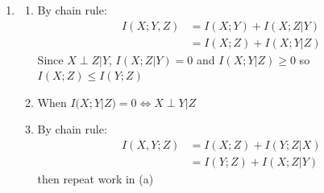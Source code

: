 \documentclass[12pt, a4paper]{article}
\begin{document}
\begin{enumerate}[Q\arabic*.]
\begin{enumerate}
      \item We have:
        \begin{align*}
          I(X_1,X_2,\dots,X_n; Y) &= H(X_1,X_2,\dots,X_n) - H(X_1,X_2,\dots,X_n|Y)\\ 
                                  &= \sum_i H(X_i | X_{i-1},\dots,X_1) - \sum_i H(X_i | X_{i-1},\dots,X_1,Y)\\ 
                                  &= \sum_i I(X_i;  Y|X_{i-1},\dots,X_1)
        \end{align*}
    \end{enumerate}

  \pagebreak
  \item 
    \begin{enumerate}
      \item By chain rule:
        \begin{align*}
          I(X;Y,Z) &= I(X;Y) + I(X;Z|Y)\\ 
                   &= I(X;Z) + I(X;Y|Z)
        \end{align*}
        Since $X\perp Z | Y$, $I(X;Z|Y) = 0$ and $I(X;Y|Z) \geq 0$ so $I(X;Z) \leq I(Y;Z)$

      \item When $I(X;Y|Z) =0 \iff X\perp Y|Z$

      \item By chain rule:
        \begin{align*}
          I(X,Y;Z) &= I(X;Z) + I(Y;Z|X)\\ 
                   &= I(Y;Z) + I(X;Z|Y)
        \end{align*}
        then repeat work in (a)
    \end{enumerate}


\end{enumerate}
\end{document}
